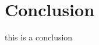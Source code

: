 \documentclass[../thesis.tex]{subfiles} %
\begin{document}
\section{Conclusion}
this is a conclusion
\end{document}
